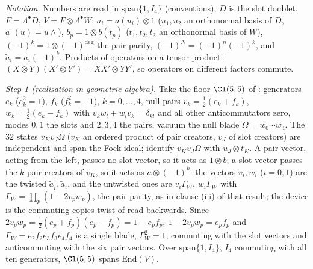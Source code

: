 \emph{Notation.} Numbers are read in $\mathrm{span}\{1, I_{4}\}$ (conventions); $D$ is the slot doublet, $F = \Lambda^{\bullet}D$, $V = F \otimes \Lambda^{\bullet}W$; $a_{i} = a(u_{i}) \otimes 1$ ($u_{1}, u_{2}$ an orthonormal basis of $D$, $a^{\dagger}(u) = u \wedge$), $b_{p} = 1 \otimes b(t_{p})$ ($t_{1}, t_{2}, t_{3}$ an orthonormal basis of $W$), $(-1)^{k} = 1 \otimes (-1)^{\deg}$ the pair parity, $(-1)^{N} = (-1)^{n}(-1)^{k}$, and $\tilde a_{i} = a_{i}(-1)^{k}$. Products of operators on a tensor product: $(X \otimes Y)(X' \otimes Y') = XX' \otimes YY'$, so operators on different factors commute.

\emph{Step 1 (realisation in geometric algebra).} Take the floor $\Cl(5,5)$ of : generators $e_{k}$ ($e_{k}^{2} = 1$), $f_{k}$ ($f_{k}^{2} = -1$), $k = 0, \dots, 4$, null pairs $v_{k} = \tfrac12(e_{k} + f_{k})$, $w_{k} = \tfrac12(e_{k} - f_{k})$ with $v_{k}w_{l} + w_{l}v_{k} = \delta_{kl}$ and all other anticommutators zero, modes $0, 1$ the slots and $2, 3, 4$ the pairs, vacuum the null blade $\Omega = w_{0}\cdots w_{4}$. The $32$ states $v_{K}v_{J}\Omega$ ($v_{K}$ an ordered product of pair creators, $v_{J}$ of slot creators) are independent and span the Fock ideal; identify $v_{K}v_{J}\Omega$ with $u_{J} \otimes t_{K}$. A pair vector, acting from the left, passes no slot vector, so it acts as $1 \otimes b$; a slot vector passes the $k$ pair creators of $v_{K}$, so it acts as $a \otimes (-1)^{k}$: the vectors $v_{i}, w_{i}$ ($i = 0, 1$) are the twisted $\tilde a^{\dagger}_{i}, \tilde a_{i}$, and the untwisted ones are $v_{i}\Gamma_{W}$, $w_{i}\Gamma_{W}$ with $\Gamma_{W} = \prod_{p}(1 - 2v_{p}w_{p})$, the pair parity, as in clause (iii) of that result; the device is the commuting-copies twist of  read backwards. Since $2v_{p}w_{p} = \tfrac12(e_{p} + f_{p})(e_{p} - f_{p}) = 1 - e_{p}f_{p}$, $1 - 2v_{p}w_{p} = e_{p}f_{p}$ and $\Gamma_{W} = e_{2}f_{2}e_{3}f_{3}e_{4}f_{4}$ is a single blade, $\Gamma_{W}^{2} = 1$, commuting with the slot vectors and anticommuting with the six pair vectors. Over $\mathrm{span}\{1, I_{4}\}$, $I_{4}$ commuting with all ten generators, $\Cl(5,5)$ spans $\mathrm{End}(V)$.

